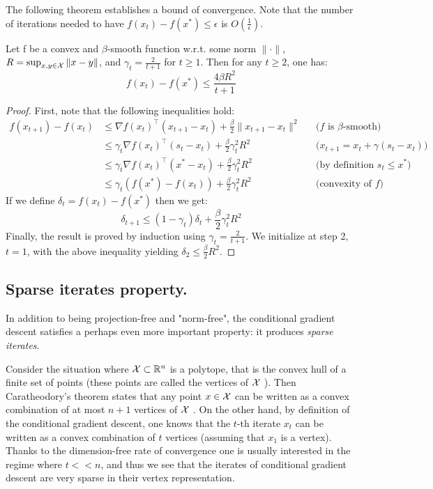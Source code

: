 The following theorem establishes a bound of convergence. Note that the number of iterations needed to have $f(x_t)-f(x^*) \leq \epsilon$  is $O(\frac{1}{\epsilon})$.

\begin{theorem}
Let f be a convex and $\beta$-smooth function w.r.t. some norm $\|\cdot\|$, $R=\sup_{x,y \in \mathcal{X}} \| x-y \|$, and $\gamma_t=\frac{2}{t+1}$ for $t \geq 1$. Then for any $t\geq2$, one has:
\begin{equation}
f(x_t)-f(x^*) \leq \frac{4 \beta R^2 }{t+1}
\end{equation}
\end{theorem}

\begin{proof}
First, note that the following inequalities hold:
  \begin{align}
    f(x_{t+1})-f(x_t) & \leq \nabla f(x_t)^\top (x_{t+1}-x_{t}) + \frac{\beta}{2} \| x_{t+1}-x_{t} \|^2 \nonumber && \text{($f$ is $\beta$-smooth)} \\
    & \leq \gamma_t \nabla f(x_t)^\top (s_{t}-x_{t}) + \frac{\beta}{2} \gamma_t^2 R^2 \nonumber && \text{($x_{t+1}=x_t+\gamma (s_t-x_t)$)} \\
    & \leq \gamma_t \nabla f(x_t)^\top (x^*-x_t) + \frac{\beta}{2} \gamma_t^2 R^2 \nonumber && \text{(by definition $s_t \leq x^*$)} \\
    & \leq \gamma_t ( f(x^*)-f(x_t)) + \frac{\beta}{2} \gamma_t^2 R^2 \nonumber && \text{(convexity of $f$)}
  \end{align}
If we define $\delta_t = f(x_t)-f(x^*)$ then we get:
\begin{equation}
\delta_{t+1} \leq (1-\gamma_t)\delta_t+\frac{\beta}{2} \gamma_t^2 R^2
\end{equation}
Finally, the result is proved by induction using $\gamma_t =\frac{2}{t+1}$. We initialize at step 2, $t=1$, with the above inequality yielding $\delta_2 \leq \frac{\beta}{2} R^2$.
\end{proof}

\subsection{Sparse iterates property.}
In addition to being projection-free and "norm-free", the conditional gradient descent satisfies a perhaps even more important property: it produces \emph{sparse iterates}.

Consider the situation where $\mathcal{X} \subset \mathbb{R}^n$ is a polytope, that is the convex hull of a finite set of points (these points are called the vertices of $\mathcal{X}$ ). Then Caratheodory's theorem states that any point $x \in \mathcal{X}$ can be written as a convex combination of at most $n+1$ vertices of $\mathcal{X}$ . On the other hand, by definition of the conditional gradient descent, one knows that the $t$-th iterate $x_t$ can be written as a convex combination of $t$ vertices (assuming that $x_1$ is a vertex). Thanks to the dimension-free rate of convergence one is usually interested in the regime where $t<<n$, and thus we see that the iterates of conditional gradient descent are very sparse in their vertex representation.

